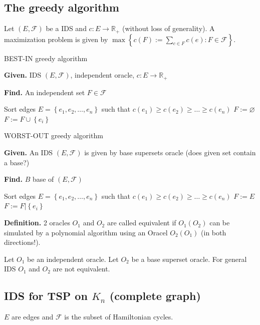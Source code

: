 \documentclass{article}
\newcommand{\set}[1]{\left\{#1\right\}}
\newcommand{\given}[1]{\textbf{Given.} #1\par}
\newcommand{\find}[1]{\textbf{Find.} #1\par}
\begin{document}
\subsection{The greedy algorithm}
%
Let $(E, \mathcal{F})$ be a IDS and $c: E \rightarrow \mathbb{R}_+$ (without loss of generality).
A maximization problem is given by $\max\set{c(F) := \sum_{c \in F} c(e): F \in \mathcal{F}}$.

\begin{algorithm}
  \caption{BEST-IN greedy algorithm}
  \label{greedy-algorithm}
  \given{IDS $(E, \mathcal{F})$, independent oracle, $c: E \rightarrow \mathbb{R}_+$}
  \find{An independent set $F \in \mathcal{F}$}
\begin{algorithmic}[1]
  \State Sort edges $E = \set{e_1, e_2, \ldots, e_n}$ such that $c(e_1) \geq c(e_2) \geq \ldots \geq c(e_n)$
  \State $F := \diameter$
    \If{$F \cup \set{e_i} \in \mathcal{F}$}
      \State $F := F \cup \set{e_i}$
    \EndIf
  \EndFor
\end{algorithmic}
\end{algorithm}

\begin{algorithm}
  \caption{WORST-OUT greedy algorithm}
  \label{worst-out-greedy-algorithm}
  \given{An IDS $(E, \mathcal{F})$ is given by base supersets oracle (does given set contain a base?)}
  \find{$B$ base of $(E, \mathcal{F})$}
\begin{algorithmic}[1]
  \State Sort edges $E = \set{e_1, e_2, \ldots, e_n}$ such that $c(e_1) \geq c(e_2) \geq \ldots \geq c(e_n)$
  \State $F := E$
    \If{$F | \set{e_i}$ contains base}
      \State $F := F | \set{e_i}$
    \EndIf
  \EndFor
\end{algorithmic}
\end{algorithm}

\textbf{Definition.}
  2 oracles $O_1$ and $O_2$ are called equivalent if $O_1(O_2)$ can be simulated by a polynomial algorithm using an Oracel $O_2(O_1)$ (in both directions!).

  Let $O_1$ be an independent oracle. Let $O_2$ be a base superset oracle.
  For general IDS $O_1$ and $O_2$ are not equivalent.

\subsection[IDS for TSP]{IDS for TSP on $K_n$ (complete graph)}
%
$E$ are edges and $\mathcal{F}$ is the subset of Hamiltonian cycles.
\end{document}
